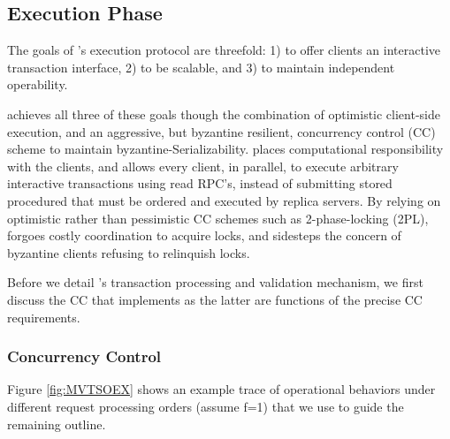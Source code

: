 \subsection{Execution Phase}
The goals of \sys{}'s execution protocol are threefold: 1) to offer clients an interactive transaction interface, 2) to be scalable, and 3) to maintain independent operability.

\sys{} achieves all three of these goals though the combination of optimistic client-side execution, and an aggressive, but byzantine resilient, concurrency control (CC) scheme to maintain byzantine-Serializability. 
\sys places computational responsibility with the clients, and allows every client, in parallel, to execute arbitrary interactive transactions using read RPC's, instead of submitting stored procedured that must be ordered and executed by replica servers.
By relying on optimistic rather than pessimistic CC schemes such as 2-phase-locking (2PL), \sys{} forgoes costly coordination to acquire locks, and sidesteps the concern of byzantine clients refusing to relinquish locks. 

Before we detail \sys{}'s transaction processing and validation mechanism, we first discuss the CC that \sys implements as the latter are functions of the precise CC requirements. 
 
\subsubsection{Concurrency Control}

Figure \ref{fig:MVTSOEX} shows an example trace of \sys operational behaviors under different request processing orders (assume f=1) that we use to guide the remaining outline.

